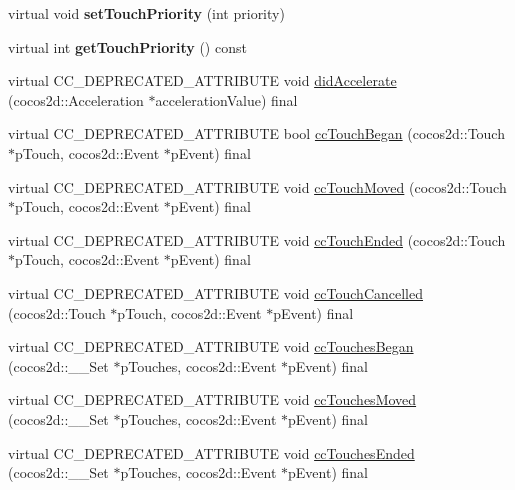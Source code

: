 \begin{DoxyCompactItemize}
virtual void {\bfseries set\+Touch\+Priority} (int priority)
\item 
\mbox{\label{classcocostudio_1_1InputDelegate_a0523464ba7a95eb1f77236425dc4236b}} 
virtual int {\bfseries get\+Touch\+Priority} () const
\item 
virtual C\+C\+\_\+\+D\+E\+P\+R\+E\+C\+A\+T\+E\+D\+\_\+\+A\+T\+T\+R\+I\+B\+U\+TE void \hyperlink{classcocostudio_1_1InputDelegate_ae59627e1bc8217fd21157ae550d5748c}{did\+Accelerate} (cocos2d\+::\+Acceleration $\ast$acceleration\+Value) final
\item 
virtual C\+C\+\_\+\+D\+E\+P\+R\+E\+C\+A\+T\+E\+D\+\_\+\+A\+T\+T\+R\+I\+B\+U\+TE bool \hyperlink{classcocostudio_1_1InputDelegate_a49ac0ed2dd298077ae8425b6254457c5}{cc\+Touch\+Began} (cocos2d\+::\+Touch $\ast$p\+Touch, cocos2d\+::\+Event $\ast$p\+Event) final
\item 
virtual C\+C\+\_\+\+D\+E\+P\+R\+E\+C\+A\+T\+E\+D\+\_\+\+A\+T\+T\+R\+I\+B\+U\+TE void \hyperlink{classcocostudio_1_1InputDelegate_acc0ec42be33478330483318aa8ec6975}{cc\+Touch\+Moved} (cocos2d\+::\+Touch $\ast$p\+Touch, cocos2d\+::\+Event $\ast$p\+Event) final
\item 
virtual C\+C\+\_\+\+D\+E\+P\+R\+E\+C\+A\+T\+E\+D\+\_\+\+A\+T\+T\+R\+I\+B\+U\+TE void \hyperlink{classcocostudio_1_1InputDelegate_a345b3a163c8c775fbf2f39ee50bf05fc}{cc\+Touch\+Ended} (cocos2d\+::\+Touch $\ast$p\+Touch, cocos2d\+::\+Event $\ast$p\+Event) final
\item 
virtual C\+C\+\_\+\+D\+E\+P\+R\+E\+C\+A\+T\+E\+D\+\_\+\+A\+T\+T\+R\+I\+B\+U\+TE void \hyperlink{classcocostudio_1_1InputDelegate_ae82031ff0cd17d514fee35e61f2b52b9}{cc\+Touch\+Cancelled} (cocos2d\+::\+Touch $\ast$p\+Touch, cocos2d\+::\+Event $\ast$p\+Event) final
\item 
virtual C\+C\+\_\+\+D\+E\+P\+R\+E\+C\+A\+T\+E\+D\+\_\+\+A\+T\+T\+R\+I\+B\+U\+TE void \hyperlink{classcocostudio_1_1InputDelegate_a2ef5dbd567482fc4c68b761e054c73ce}{cc\+Touches\+Began} (cocos2d\+::\+\_\+\+\_\+\+Set $\ast$p\+Touches, cocos2d\+::\+Event $\ast$p\+Event) final
\item 
virtual C\+C\+\_\+\+D\+E\+P\+R\+E\+C\+A\+T\+E\+D\+\_\+\+A\+T\+T\+R\+I\+B\+U\+TE void \hyperlink{classcocostudio_1_1InputDelegate_ac7a07acaea2e6e6c7b106a78e52153d9}{cc\+Touches\+Moved} (cocos2d\+::\+\_\+\+\_\+\+Set $\ast$p\+Touches, cocos2d\+::\+Event $\ast$p\+Event) final
\item 
virtual C\+C\+\_\+\+D\+E\+P\+R\+E\+C\+A\+T\+E\+D\+\_\+\+A\+T\+T\+R\+I\+B\+U\+TE void \hyperlink{classcocostudio_1_1InputDelegate_aea6b8632e429c8513cf0a6ac90b41375}{cc\+Touches\+Ended} (cocos2d\+::\+\_\+\+\_\+\+Set $\ast$p\+Touches, cocos2d\+::\+Event $\ast$p\+Event) final

\end{DoxyCompactItemize}
